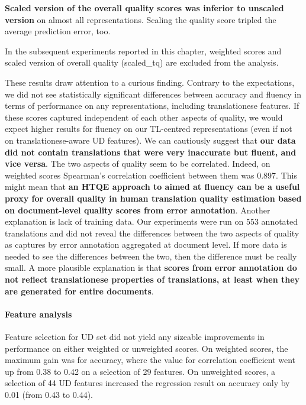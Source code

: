 \textbf{Scaled version of the overall quality scores was inferior to unscaled version} on almost all representations. %
Scaling the quality score tripled the average prediction error, too.

In the subsequent experiments reported in this chapter, weighted scores and scaled version of overall quality (scaled\_tq) are excluded from the analysis.

These results draw attention to a curious finding. Contrary to the expectations, we did not see statistically significant differences between accuracy and fluency in terms of performance on any representations, including translationese features. If these scores captured independent of each other aspects of quality, we would expect higher results for fluency on our TL-centred representations (even if not on translationese-aware UD features). We can cautiously suggest that \textbf{our data did not contain translations that were very inaccurate but fluent, and vice versa}. The two aspects of quality seem to be correlated. Indeed, on weighted scores Spearman's correlation coefficient between them was 0.897. %
This might mean that \textbf{an \gls{HTQE} approach to aimed at fluency can be a useful proxy for overall quality in human translation quality estimation based on document-level quality scores from error annotation}.
Another explanation is lack of training data. Our experiments were run on 553 annotated translations and did not reveal the differences between the two aspects of quality as captures by error annotation aggregated at document level. If more data is needed to see the differences between the two, then the difference must be really small. A more plausible explanation is that \textbf{scores from error annotation do not reflect translationese properties of translations, at least when they are generated for entire documents}. %

\paragraph{Feature analysis} 
Feature selection for UD set did not yield any sizeable improvements in performance on either weighted or unweighted scores. 
On weighted scores, the maximum gain was for accuracy, where the value for correlation coefficient went up from 0.38 to 0.42 on a selection of 29 features. On unweighted scores, a selection of 44 UD features increased the regression result on accuracy only by 0.01 (from 0.43 to 0.44). 

